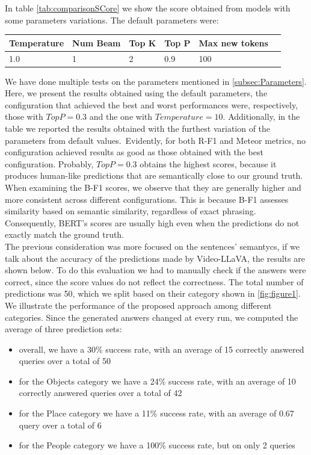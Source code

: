 \documentclass[10pt,twocolumn,letterpaper]{article}
\begin{document}
In table \ref{tab:comparisonSCore} we show the score obtained from models with some parameters variations.
The default parameters were:

\begin{table}[h]
\centering
\scriptsize
\label{tab:performance}
\begin{tabular}{@{}p{1.2cm}p{1.0cm}p{1.0cm}p{1.0cm}p{1.0cm}p{1.5cm}@{}}
\toprule
Temperature & Num Beam & Top K & Top P & Max new tokens \\ \midrule
1.0 & 1 & 2 & 0.9 & 100 \\ 
\bottomrule
\end{tabular}
\captionsetup{font=footnotesize}
\end{table}

We have done multiple tests on the parameters mentioned in \ref{subsec:Parameters}. Here, we present the results obtained using the default parameters, the configuration that achieved the best and worst performances were, respectively, those with $Top P = 0.3$ and the one with $Temperature = 10$. Additionally, in the table we reported the results obtained with the furthest variation of the parameters from default values.\
Evidently, for both R-F1 and Meteor metrics, no configuration achieved results as good as those obtained with the best configuration. Probably, $Top P = 0.3$ obtains the highest scores, because it produces human-like predictions that are semantically close to our ground truth. When examining the B-F1 scores, we observe that they are generally higher and more consistent across different configurations. This is because B-F1 assesses similarity based on semantic similarity, regardless of exact phrasing. Consequently, BERT's scores are usually high even when the predictions do not exactly match the ground truth.
\\
The previous consideration was more focused on the sentences' semantycs, if we talk about the accuracy of the predictions made by Video-LLaVA, the results are shown below. To do this evaluation we had to manually check if the answers were correct, since the score values do not reflect the correctness. The total number of predictions was 50, which we split based on their category shown in \ref{fig:figure1}. We illustrate the performance of the proposed approach among different categories.
Since the generated answers changed at every run, we computed the average of three prediction sets:

\begin{itemize}
\itemsep=0.1cm  
\small
    \item overall, we have a 30\% success rate, with an average of 15 correctly answered queries over a total of 50
    \item for the Objects category we have a 24\% success rate, with an average of 10 correctly answered queries over a total of 42
    \item for the Place category we have a 11\% success rate, with an average of 0.67 query over a total of 6
    \item for the People category we have a 100\% success rate, but on only 2 queries   
\end{itemize}
\end{document}
